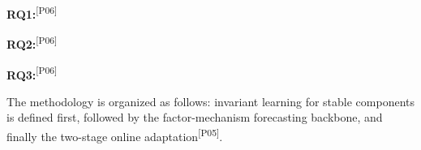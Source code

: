 ﻿\documentclass[journal]{IEEEtran}
\DeclareRobustCommand{\auditbad}[2]{{\color{auditred}#1}{\color{auditred}\textsuperscript{[#2]}}}
\begin{document}
\auditbad{\textbf{RQ1:}}{P06} 


\auditbad{\textbf{RQ2:}}{P06} 


\auditbad{\textbf{RQ3:}}{P06} 



The methodology is organized as follows: invariant learning for stable components is defined first, followed by the factor-mechanism forecasting backbone, and finally the \auditbad{two-stage online adaptation}{P05}.
\end{document}
